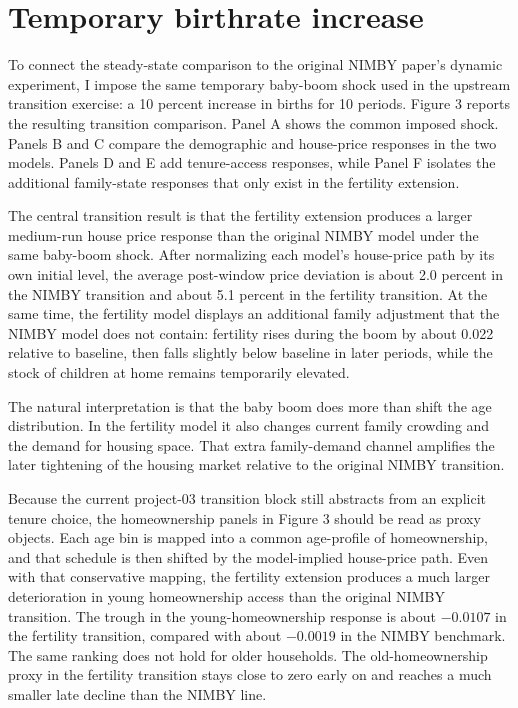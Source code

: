 \documentclass[11pt]{article}
\begin{document}
\section{Temporary birthrate increase}

To connect the steady-state comparison to the original NIMBY paper's dynamic experiment, I impose
the same temporary baby-boom shock used in the upstream transition exercise: a 10 percent
increase in births for 10 periods. Figure 3 reports the resulting transition comparison. Panel A
shows the common imposed shock. Panels B and C compare the demographic and house-price responses
in the two models. Panels D and E add tenure-access responses, while Panel F isolates the
additional family-state responses that only exist in the fertility extension.

The central transition result is that the fertility extension produces a larger medium-run house
price response than the original NIMBY model under the same baby-boom shock. After normalizing
each model's house-price path by its own initial level, the average post-window price deviation is
about 2.0 percent in the NIMBY transition and about 5.1 percent in the fertility transition. At
the same time, the fertility model displays an additional family adjustment that the NIMBY model
does not contain: fertility rises during the boom by about 0.022 relative to baseline, then falls
slightly below baseline in later periods, while the stock of children at home remains temporarily
elevated.

The natural interpretation is that the baby boom does more than shift the age distribution. In the
fertility model it also changes current family crowding and the demand for housing space. That
extra family-demand channel amplifies the later tightening of the housing market relative to the
original NIMBY transition.

Because the current project-03 transition block still abstracts from an explicit tenure choice,
the homeownership panels in Figure 3 should be read as proxy objects. Each age bin is mapped into
a common age-profile of homeownership, and that schedule is then shifted by the model-implied
house-price path. Even with that conservative mapping, the fertility extension produces a much
larger deterioration in young homeownership access than the original NIMBY transition. The trough
in the young-homeownership response is about $-0.0107$ in the fertility transition, compared with
about $-0.0019$ in the NIMBY benchmark. The same ranking does not hold for older households. The
old-homeownership proxy in the fertility transition stays close to zero early on and reaches a
much smaller late decline than the NIMBY line.
\end{document}
